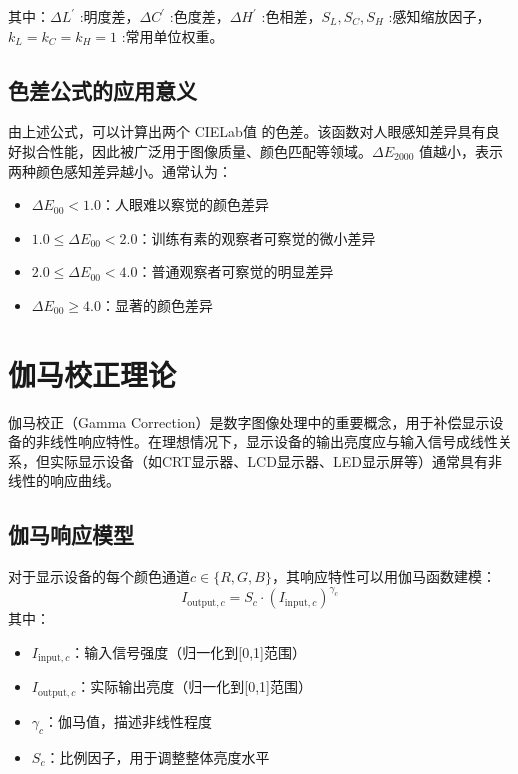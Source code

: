 其中：$\Delta L^{'}$ :明度差，$\Delta C^{'}$ :色度差，$\Delta H^{'}$ :色相差，$S_{L},S_{C},S_{H}$ :感知缩放因子，$k_{L}=k_{C}=k_{H}=1$ :常用单位权重。

\subsection[\hspace{-2pt}色差公式的应用意义]{{\heiti{} \hspace{-8pt}色差公式的应用意义}}\label{subsection2: 色差公式的应用意义}

由上述公式，可以计算出两个 CIELab值 的色差。该函数对人眼感知差异具有良好拟合性能，因此被广泛用于图像质量、颜色匹配等领域。$\Delta E_{2000}$ 值越小，表示两种颜色感知差异越小。通常认为：
\begin{itemize}
    \item $\Delta E_{00} < 1.0$：人眼难以察觉的颜色差异
    \item $1.0 \leq \Delta E_{00} < 2.0$：训练有素的观察者可察觉的微小差异
    \item $2.0 \leq \Delta E_{00} < 4.0$：普通观察者可察觉的明显差异
    \item $\Delta E_{00} \geq 4.0$：显著的颜色差异
\end{itemize}

\section[\hspace{-2pt}伽马校正理论]{{\heiti{} \hspace{-8pt}伽马校正理论}}\label{section2: 伽马校正理论}

伽马校正（Gamma Correction）是数字图像处理中的重要概念，用于补偿显示设备的非线性响应特性。在理想情况下，显示设备的输出亮度应与输入信号成线性关系，但实际显示设备（如CRT显示器、LCD显示器、LED显示屏等）通常具有非线性的响应曲线。

\subsection[\hspace{-2pt}伽马响应模型]{{\heiti{} \hspace{-8pt}伽马响应模型}}\label{subsection2: 伽马响应模型}

对于显示设备的每个颜色通道$c \in \{R,G,B\}$，其响应特性可以用伽马函数建模：
\begin{equation}
I_{\text{output},c} = S_c \cdot (I_{\text{input},c})^{\gamma_c}
\end{equation}
其中：
\begin{itemize}
    \item $I_{\text{input},c}$：输入信号强度（归一化到[0,1]范围）
    \item $I_{\text{output},c}$：实际输出亮度（归一化到[0,1]范围）
    \item $\gamma_c$：伽马值，描述非线性程度
    \item $S_c$：比例因子，用于调整整体亮度水平
\end{itemize}

